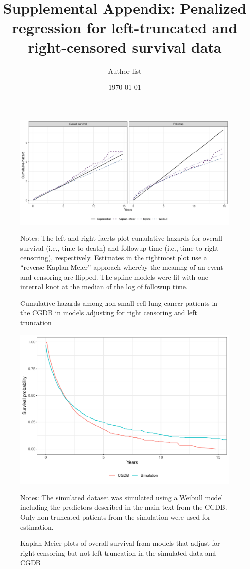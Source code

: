 \documentclass[11pt,final,fleqn]{article}
\title{Supplemental Appendix: Penalized regression for left-truncated and right-censored survival data}
\author{Author list}
\date{\today}
\begin{document}
\maketitle

\begin{figure}[h]
\centering
\includegraphics[max size={\textwidth}]{figs/sim_calibration_cumhaz.pdf} 
\caption{Cumulative hazards among non-small cell lung cancer patients in the CGDB in models adjusting for right censoring and left truncation}
\begin{minipage}{\linewidth}
\footnotesize
Notes: The left and right facets plot cumulative hazards for overall survival (i.e., time to death) and followup time (i.e., time to right censoring), respectively. Estimates in the rightmost plot use a ``reverse Kaplan-Meier'' approach whereby the meaning of an event and censoring are flipped. The spline models were fit with one internal knot at the median of the log of followup time. 
\end{minipage}
\end{figure}

\begin{figure}[h]
\centering
\includegraphics[max size={\textwidth}]{figs/sim_p11_km_plot_rwd_v_sim.pdf} 
\caption{Kaplan-Meier plots of overall survival from models that adjust for right censoring but not left truncation in the simulated data and CGDB}
\begin{minipage}{\linewidth}
\footnotesize
Notes: The simulated dataset was simulated using a Weibull model including the predictors described in the main text from the CGDB. Only non-truncated patients from the simulation were used for estimation. 
\end{minipage}
\end{figure}
\end{document}
